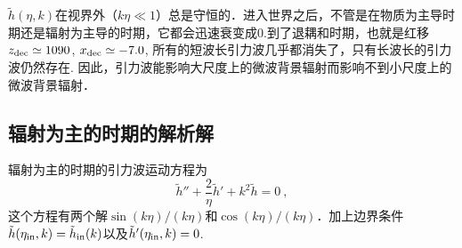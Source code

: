 $\tilde h(\eta,k)$在视界外（$k\eta\ll 1$）总是守恒的．进入世界之后，不管是在物质为主导时期还是辐射为主导的时期，它都会迅速衰变成0.到了退耦和时期，也就是红移$z_{\rm dec} \simeq 1090$, $x_{\rm dec}\simeq -7.0$, 所有的短波长引力波几乎都消失了，只有长波长的引力波仍然存在. 因此，引力波能影响大尺度上的微波背景辐射而影响不到小尺度上的微波背景辐射．

\subsection{辐射为主的时期的解析解}
辐射为主的时期的引力波运动方程为
\begin{equation}
\tilde h'' + \frac{2}{\eta} \tilde h' + k^2 \tilde h = 0~,
\end{equation}
这个方程有两个解$\sin(k\eta)/(k\eta)$和$\cos(k\eta)/(k\eta)$．加上边界条件$\tilde h(\eta_{\rm in},k) = \tilde h_{\rm in} (k)$以及$\tilde h'(\eta_{\rm in},k) = 0$. 




















